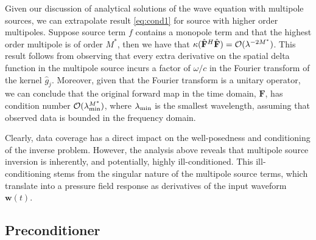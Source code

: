 Given our discussion of analytical solutions of the wave equation with multipole sources, we can extrapolate result \ref{eq:cond1} for source with higher order multipoles. 
Suppose source term $f$ contains a monopole term and that the highest order multipole is of order $M^*$, then we have that $\kappa(\hat{\mathbf{F}}^H\hat{\mathbf{F}}) = \mathcal O(\lambda^{-2M^*})$.
This result follows from observing that every extra derivative on the spatial delta function in the multipole source incurs a factor of $\omega/c$ in the Fourier transform of the kernel $\hat g_j$.
Moreover, given that the Fourier transform is a unitary operator, we can conclude that the original forward map in the time domain, $\mathbf F$, has condition number $\mathcal O(\lambda_{\rm min}^{M^*})$, where $\lambda_{\rm min}$ is the smallest wavelength, assuming that observed data is bounded in the frequency domain. 

Clearly, data coverage has a direct impact on the well-posedness and conditioning of the inverse problem.
However, the analysis above reveals that multipole source inversion is inherently, and potentially, highly ill-conditioned.
This ill-conditioning stems from the singular nature of the multipole source terms, which translate into a pressure field response as derivatives of the input waveform $\mathbf w(t)$.


\newpage

\subsection{Preconditioner}


